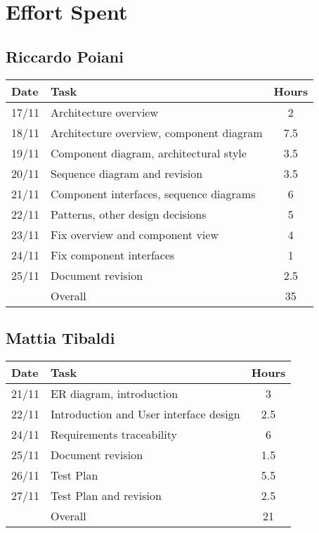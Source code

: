 \section{Effort Spent}

\subsection{Riccardo Poiani}

\begin{table}[H]
\begin{tabularx}{\textwidth}{|l|X|c|}
\hline
\rowcolor[HTML]{C0C0C0} 
Date & Task & Hours\\ \hline
17/11 & Architecture overview & 2\\ \hline
18/11 & Architecture overview, component diagram & 7.5 \\ \hline
19/11 & Component diagram, architectural style & 3.5\\ \hline
20/11 & Sequence diagram and revision & 3.5\\ \hline
21/11 & Component interfaces, sequence diagrams & 6\\ \hline
22/11 & Patterns, other design decisions & 5 \\ \hline
23/11 & Fix overview and component view & 4  \\  \hline
24/11 & Fix component interfaces & 1 \\ \hline
25/11 & Document revision & 2.5 \\ \hline
\rowcolor[HTML]{C0C0C0} 
& Overall & 35 \\ \hline
\end{tabularx}
\end{table}

\subsection{Mattia Tibaldi}

\begin{table}[H]
\begin{tabularx}{\textwidth}{|l|X|c|}
\hline
\rowcolor[HTML]{C0C0C0} 
Date & Task & Hours\\ \hline
21/11 & ER diagram, introduction & 3 \\ \hline
22/11 & Introduction and User interface design & 2.5 \\ \hline
24/11 & Requirements traceability & 6 \\ \hline 
25/11 & Document revision & 1.5 \\ \hline
26/11 & Test Plan & 5.5\\ \hline
27/11 & Test Plan and revision & 2.5\\ \hline
\rowcolor[HTML]{C0C0C0} 
& Overall & 21\\ \hline
\end{tabularx}
\end{table}

